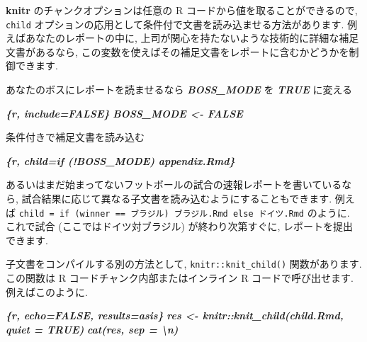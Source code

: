 \documentclass[
  11pt,
  lualatex,
  ja=standard]{bxjsreport}
\newenvironment{Shaded}{\begin{snugshade}}{\end{snugshade}}
\newcommand{\InformationTok}[1]{\textcolor[rgb]{0.56,0.35,0.01}{\textbf{\textit{#1}}}}
\newcommand{\NormalTok}[1]{#1}
\begin{document}
\textbf{knitr} のチャンクオプションは任意の R コードから値を取ることができるので, \texttt{child} オプションの応用として条件付で文書を読み込ませる方法があります. 例えばあなたのレポートの中に, 上司が関心を持たないような技術的に詳細な補足文書があるなら, この変数を使えばその補足文書をレポートに含むかどうかを制御できます.

\begin{Shaded}
\begin{Highlighting}[]
\NormalTok{あなたのボスにレポートを読ませるなら }\InformationTok{\textasciigrave{}BOSS\_MODE\textasciigrave{}}\NormalTok{ を }\InformationTok{\textasciigrave{}TRUE\textasciigrave{}}\NormalTok{ に変える}

\InformationTok{\textasciigrave{}\textasciigrave{}\textasciigrave{}\{r, include=FALSE\}}
\InformationTok{BOSS\_MODE \textless{}{-} FALSE}
\InformationTok{\textasciigrave{}\textasciigrave{}\textasciigrave{}}

\NormalTok{条件付きで補足文書を読み込む}

\InformationTok{\textasciigrave{}\textasciigrave{}\textasciigrave{}\{r, child=if (!BOSS\_MODE) \textquotesingle{}appendix.Rmd\textquotesingle{}\}}
\InformationTok{\textasciigrave{}\textasciigrave{}\textasciigrave{}}
\end{Highlighting}
\end{Shaded}

あるいはまだ始まってないフットボールの試合の速報レポートを書いているなら, 試合結果に応じて異なる子文書を読み込むようにすることもできます. 例えば \texttt{child = if (winner == \textquotesingle{}ブラジル\textquotesingle{})\ \textquotesingle{}ブラジル.Rmd\textquotesingle{}\ else\ \textquotesingle{}ドイツ.Rmd\textquotesingle{}} のように. これで試合 (ここではドイツ対ブラジル) が終わり次第すぐに, レポートを提出できます.

子文書をコンパイルする別の方法として, \texttt{knitr::knit\_child()} 関数があります. この関数は R コードチャンク内部またはインライン R コードで呼び出せます. 例えばこのように.

\begin{Shaded}
\begin{Highlighting}[]
\InformationTok{\textasciigrave{}\textasciigrave{}\textasciigrave{}\{r, echo=FALSE, results=\textquotesingle{}asis\textquotesingle{}\}}
\InformationTok{res \textless{}{-} knitr::knit\_child(\textquotesingle{}child.Rmd\textquotesingle{}, quiet = TRUE)}
\InformationTok{cat(res, sep = \textquotesingle{}\textbackslash{}n\textquotesingle{})}
\InformationTok{\textasciigrave{}\textasciigrave{}\textasciigrave{}}
\end{Highlighting}
\end{Shaded}
\end{document}
